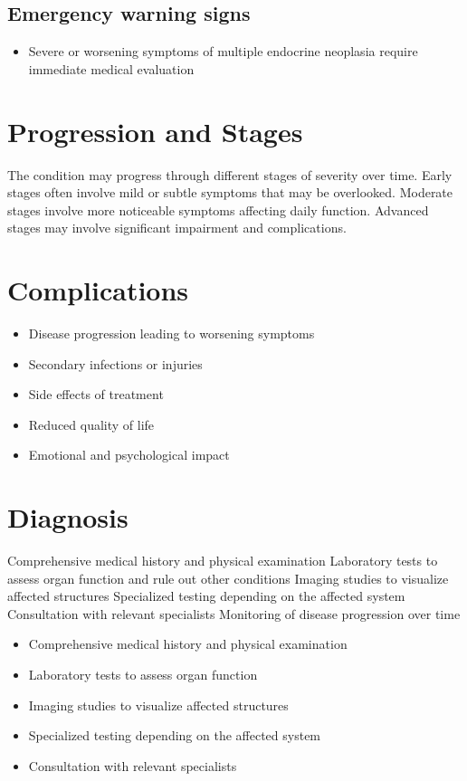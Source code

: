 \subsection{Emergency warning signs}
\begin{itemize}[noitemsep]
  \item Severe or worsening symptoms of multiple endocrine neoplasia require immediate medical evaluation
\end{itemize}
\section{Progression and Stages}
The condition may progress through different stages of severity over time. Early stages often involve mild or subtle symptoms that may be overlooked. Moderate stages involve more noticeable symptoms affecting daily function. Advanced stages may involve significant impairment and complications.
\section{Complications}
\begin{itemize}[noitemsep]
  \item Disease progression leading to worsening symptoms
  \item Secondary infections or injuries
  \item Side effects of treatment
  \item Reduced quality of life
  \item Emotional and psychological impact
\end{itemize}
\section{Diagnosis}
Comprehensive medical history and physical examination Laboratory tests to assess organ function and rule out other conditions Imaging studies to visualize affected structures Specialized testing depending on the affected system Consultation with relevant specialists Monitoring of disease progression over time

\begin{itemize}[noitemsep]
  \item Comprehensive medical history and physical examination
  \item Laboratory tests to assess organ function
  \item Imaging studies to visualize affected structures
  \item Specialized testing depending on the affected system
  \item Consultation with relevant specialists
\end{itemize}
